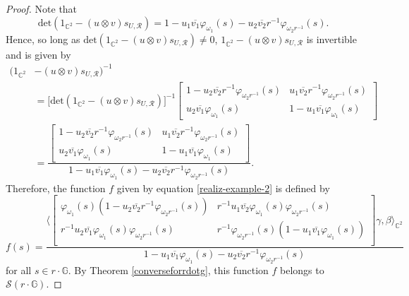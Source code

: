 \documentclass[12pt,reqno]{amsart}
\numberwithin{equation}{section}
\renewcommand\phi{\varphi}
\theoremstyle{definition}
\begin{document}
\begin{proof}
Note that 
$$\mathrm{det}(1_{\mathbb{C}^{2}}-( u\otimes v )s_{U,\mathcal{R}}) =1-u_{1}\overline{v_{1}}\phi_{\omega_{1}}(s)-u_{2}\overline{v_{2}}r^{-1}\phi_{\omega_{2}r^{-1}}(s).$$
Hence, so long as $\mathrm{det}(1_{\mathbb{C}^{2}}-( u\otimes v )s_{U,\mathcal{R}})\neq 0$, $1_{\mathbb{C}^{2}}-( u\otimes v )s_{U,\mathcal{R}}$ is invertible and is given by 
\begin{align*}
    (1_{\mathbb{C}^{2}} &-( u\otimes v )s_{U,\mathcal{R}})^{-1}  \\   
    &= \big[\mathrm{det}(1_{\mathbb{C}^{2}}-( u\otimes v )s_{U,\mathcal{R}})\big]^{-1}\begin{bmatrix}
    1-u_{2}\overline{v_{2}}r^{-1}\phi_{\omega_{2}r^{-1}}(s) & u_{1}\overline{v_{2}}r^{-1}\phi_{\omega_{2}r^{-1}}(s)\\
    u_{2}\overline{v_{1}}\phi_{\omega_{1}}(s)  & 1-u_{1}\overline{v_{1}}\phi_{\omega_{1}}(s)
\end{bmatrix} \\
&=\dfrac{\begin{bmatrix}
    1-u_{2}\overline{v_{2}}r^{-1}\phi_{\omega_{2}r^{-1}}(s) & u_{1}\overline{v_{2}}r^{-1}\phi_{\omega_{2}r^{-1}}(s) \\
    u_{2}\overline{v_{1}}\phi_{\omega_{1}}(s)  & 1-u_{1}\overline{v_{1}}\phi_{\omega_{1}}(s) 
\end{bmatrix}}{1-u_{1}\overline{v_{1}}\phi_{\omega_{1}}(s) -u_{2}\overline{v_{2}}r^{-1}\phi_{\omega_{2}r^{-1}}(s) }.
\end{align*}
Therefore,  the function $f$ given by equation \eqref{realiz-example-2} is defined by 
\small{
\begin{equation*}
    f(s)=\dfrac{\Bigg\langle \begin{bmatrix}
    \phi_{\omega_{1}}(s) (1-u_{2}\overline{v_{2}}r^{-1}\phi_{\omega_{2}r^{-1}}(s) ) & r^{-1}u_{1}\overline{v_{2}}\phi_{\omega_{1}}(s) \phi_{\omega_{2}r^{-1}}(s) \\
    r^{-1}u_{2}\overline{v_{1}}\phi_{\omega_{1}}(s) \phi_{\omega_{2}r^{-1}}(s)  & r^{-1}\phi_{\omega_{2}r^{-1}}(s) (1-u_{1}\overline{v_{1}}\phi_{\omega_{1}}(s) )\\
\end{bmatrix}\gamma,\beta\Bigg\rangle_{\mathbb{C}^{2}}}{1-u_{1}\overline{v_{1}}\phi_{\omega_{1}}(s) -u_{2}\overline{v_{2}}r^{-1}\phi_{\omega_{2}r^{-1}}(s) }
\end{equation*} }
for all $s\in r\cdot\mathbb{G}$. By  Theorem \ref{converseforrdotg}, this function $f$ belongs to  $\mathcal{S}(r\cdot \mathbb{G})$.\end{proof}
\end{document}
